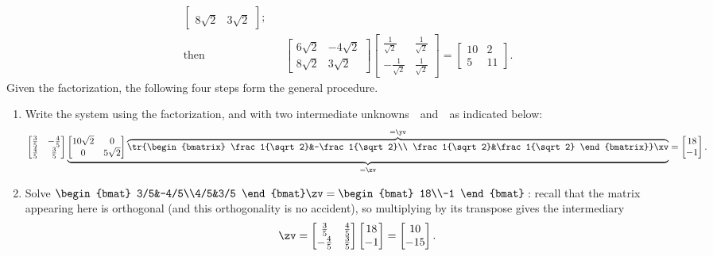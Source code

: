 \begin{example}
\begin{solution}
\begin{eqnarray*}
\begin{bmatrix}
\\ 8{\sqrt2}&3{\sqrt2} \end{bmatrix};
\\\text{then}&&
\begin{bmatrix} 6{\sqrt2}& -4{\sqrt2}
\\ 8{\sqrt2}&3{\sqrt2} \end{bmatrix}
\begin{bmatrix} \frac1{\sqrt2}&\frac1{\sqrt2}\\ -\frac1{\sqrt2}&\frac1{\sqrt2} \end{bmatrix}
=\begin{bmatrix} 10&2\\5&11 \end{bmatrix}.
\end{eqnarray*}
Given the factorization, the following four steps form the general procedure. 
\begin{enumerate}
\item Write the system using the factorization, and with two intermediate unknowns~\yv\ and~\zv\ as indicated below:
\begin{equation*}
\begin{bmatrix} \frac35&-\frac45\\\frac45&\frac35 \end{bmatrix}
\underbrace{\begin{bmatrix} 10\sqrt2&0\\0&5\sqrt2 \end{bmatrix}
\overbrace{\tr{\begin{bmatrix} \frac1{\sqrt2}&-\frac1{\sqrt2}\\ \frac1{\sqrt2}&\frac1{\sqrt2} \end{bmatrix}}\xv}^{=\yv}}_{=\zv}=\begin{bmatrix} 18\\-1 \end{bmatrix}.
\end{equation*}

\item Solve \(\begin{bmat} 3/5&-4/5\\4/5&3/5 \end{bmat}\zv=\begin{bmat} 18\\-1 \end{bmat}\)\,: recall that the matrix appearing here is orthogonal (and this orthogonality is no accident), so multiplying by its transpose gives the intermediary
\begin{equation*}
\zv=\begin{bmatrix} \frac35&\frac45\\-\frac45&\frac35 \end{bmatrix}
\begin{bmatrix} 18\\-1 \end{bmatrix}
=\begin{bmatrix} 10\\-15 \end{bmatrix}.
\end{equation*}


\end{enumerate}
\end{solution}
\end{example}
